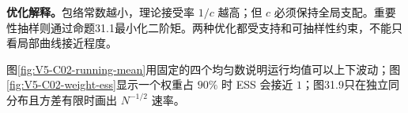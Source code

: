\documentclass[UTF8,a4paper,11pt,openany]{ctexbook}
\begin{document}
\setcounter{page}{739}
\setcounter{chapter}{31}
\setcounter{figure}{6}
\pagestyle{headings}
\textbf{优化解释。}包络常数越小，理论接受率 $1/c$ 越高；但 $c$ 必须保持全局支配。重要性抽样则通过命题31.1最小化二阶矩。两种优化都受支持和可抽样性约束，不能只看局部曲线接近程度。

图\ref{fig:V5-C02-running-mean}用固定的四个均匀数说明运行均值可以上下波动；图\ref{fig:V5-C02-weight-ess}显示一个权重占 $90\%$ 时 ESS 会接近 $1$；图31.9只在独立同分布且方差有限时画出 $N^{-1/2}$ 速率。


\end{document}
